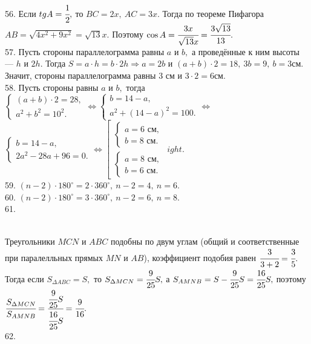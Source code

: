 56. Если $tg A=\cfrac{1}{2},$ то $BC=2x,\ AC=3x.$ Тогда по теореме Пифагора $AB=\sqrt{4x^2+9x^2}=\sqrt{13}x.$ Поэтому $\cos A=\cfrac{3x}{\sqrt{13}x}=\cfrac{3\sqrt{13}}{13}.$\\
57. Пусть стороны параллелограмма равны $a$ и $b,$ а проведённые к ним высоты --- $h$ и $2h.$ Тогда $S=a\cdot h=b\cdot 2h\Rightarrow a=2b$ и $(a+b)\cdot2=18,\ 3b=9,\ b=3$см. Значит, стороны параллелограмма равны 3 см и $3\cdot2=6$см.\\
58. Пусть стороны равны $a$ и $b,$ тогда $\begin{cases}(a+b)\cdot2=28,\\ a^2+b^2=10^2.\end{cases}\Leftrightarrow
\begin{cases}b=14-a,\\ a^2+(14-a)^2=100.\end{cases}\Leftrightarrow$\\$
\begin{cases}b=14-a,\\ 2a^2-28a+96=0.\end{cases}\Leftrightarrow
\left[\begin{array}{l}\begin{cases}a=6\text{ см},\\ b=8\text{ см}.\end{cases}\\ \begin{cases}a=8\text{ см},\\ b=6\text{ см}.\end{cases}\end{array}
ight.$\\
59. $(n-2)\cdot180^\circ=2\cdot360^\circ,\ n-2=4,\ n=6.$\\
60. $(n-2)\cdot180^\circ=3\cdot360^\circ,\ n-2=6,\ n=8.$\\
61. \begin{figure}[ht!]
\end{figure}\\
Треугольники $MCN$ и $ABC$ подобны по двум углам (общий и соответственные при паралелльных прямых $MN$ и $AB$), коэффициент подобия равен $\cfrac{3}{3+2}=\cfrac{3}{5}.$ Тогда если $S_{\Delta ABC}=S,$ то $S_{\Delta MCN}=\cfrac{9}{25}S,$ а $S_{AMNB}=S-\cfrac{9}{25}S=\cfrac{16}{25}S,$ поэтому $\cfrac{S_{\Delta MCN}}{S_{AMNB}}=\cfrac{\cfrac{9}{25}S}{\cfrac{16}{25}S}=\cfrac{9}{16}.$\\
62. \begin{figure}[ht!]
\end{figure}\\
